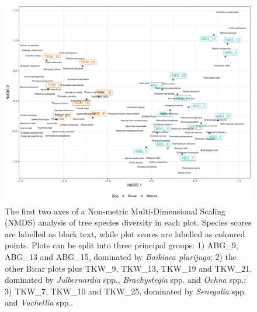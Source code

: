 \documentclass[11pt,a4paper]{article}
\begin{document}
\begin{figure}[H]
\centering
	\includegraphics[width=\textwidth]{nmds}
	\caption{The first two axes of a Non-metric Multi-Dimensional Scaling (NMDS) analysis of tree species diversity in each plot. Species scores are labelled as black text, while plot scores are labelled as coloured points. Plots can be split into three principal groups: 1) ABG\_9, ABG\_13 and ABG\_15, dominated by \textit{Baikiaea plurijuga}; 2) the other Bicar plots plus TKW\_9, TKW\_13, TKW\_19 and TKW\_21, dominated by \textit{Julbernardia} spp., \textit{Brachystegia} spp. and \textit{Ochna} spp.; 3) TKW\_7, TKW\_10 and TKW\_25, dominated by \textit{Senegalia} spp. and \textit{Vachellia} spp..}
	\label{nmds}
\end{figure}
\end{document}
